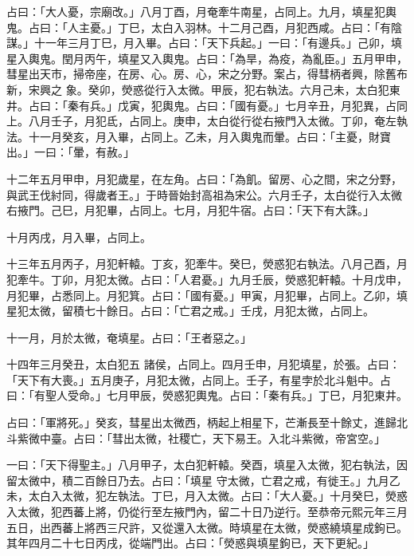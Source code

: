 \begin{pinyinscope}
 占曰：「大人憂，宗廟改。」八月丁酉，月奄牽牛南星，占同上。九月，填星犯輿鬼。占曰：「人主憂。」丁巳，太白入羽林。十二月己酉，月犯西咸。占曰：「有陰謀。」十一年三月丁巳，月入畢。占曰：「天下兵起。」一曰：「有邊兵。」己卯，填星入輿鬼。閏月丙午，填星又入輿鬼。占曰：「為旱，為疫，為亂臣。」五月甲申，彗星出天市，掃帝座，在房、心。房、心，宋之分野。案占，得彗柄者興，除舊布新，宋興之
 象。癸卯，熒惑從行入太微。甲辰，犯右執法。六月己未，太白犯東井。占曰：「秦有兵。」戊寅，犯輿鬼。占曰：「國有憂。」七月辛丑，月犯異，占同上。八月壬子，月犯氐，占同上。庚申，太白從行從右掖門入太微。丁卯，奄左執法。十一月癸亥，月入畢，占同上。乙未，月入輿鬼而暈。占曰：「主憂，財寶出。」一曰：「暈，有赦。」



 十二年五月甲申，月犯歲星，在左角。占曰：「為飢。留房、心之間，宋之分野，與武王伐紂同，得歲者王。」于時晉始封高祖為宋公。六月壬子，太白從行入太微
 右掖門。己巳，月犯畢，占同上。七月，月犯牛宿。占曰：「天下有大誅。」



 十月丙戌，月入畢，占同上。



 十三年五月丙子，月犯軒轅。丁亥，犯牽牛。癸巳，熒惑犯右執法。八月己酉，月犯牽牛。丁卯，月犯太微。占曰：「人君憂。」九月壬辰，熒惑犯軒轅。十月戊申，月犯畢，占悉同上。月犯箕。占曰：「國有憂。」甲寅，月犯畢，占同上。乙卯，填星犯太微，留積七十餘日。占曰：「亡君之戒。」壬戌，月犯太微，占同上。



 十一月，月於太微，奄填星。占曰：「王者惡之。」



 十四年三月癸丑，太白犯五
 諸侯，占同上。四月壬申，月犯填星，於張。占曰：「天下有大喪。」五月庚子，月犯太微，占同上。壬子，有星孛於北斗魁中。占曰：「有聖人受命。」七月甲辰，熒惑犯輿鬼。占曰：「秦有兵。」丁巳，月犯東井。



 占曰：「軍將死。」癸亥，彗星出太微西，柄起上相星下，芒漸長至十餘丈，進歸北斗紫微中臺。占曰：「彗出太微，社稷亡，天下易王。入北斗紫微，帝宮空。」



 一曰：「天下得聖主。」八月甲子，太白犯軒轅。癸酉，填星入太微，犯右執法，因留太微中，積二百餘日乃去。占曰：「填星
 守太微，亡君之戒，有徙王。」九月乙未，太白入太微，犯左執法。丁巳，月入太微。占曰：「大人憂。」十月癸巳，熒惑入太微，犯西蕃上將，仍從行至左掖門內，留二十日乃逆行。至恭帝元熙元年三月五日，出西蕃上將西三尺許，又從還入太微。時填星在太微，熒惑繞填星成鉤已。其年四月二十七日丙戌，從端門出。占曰：「熒惑與填星鉤已，天下更紀。」




\end{pinyinscope}
